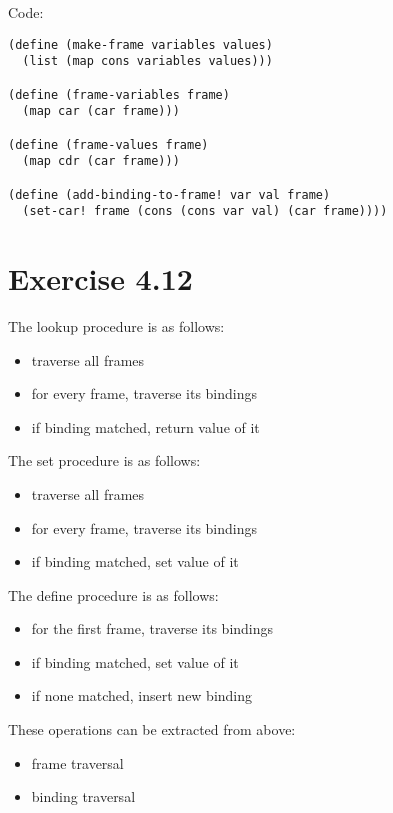 \documentclass[../main.tex]{subfiles}
\begin{document}
Code:

\begin{lstlisting}
(define (make-frame variables values)
  (list (map cons variables values)))

(define (frame-variables frame)
  (map car (car frame)))

(define (frame-values frame)
  (map cdr (car frame)))

(define (add-binding-to-frame! var val frame)
  (set-car! frame (cons (cons var val) (car frame))))
\end{lstlisting}

\section{Exercise 4.12}

The lookup procedure is as follows:

\begin{itemize}
\item traverse all frames
\item for every frame, traverse its bindings
\item if binding matched, return value of it
\end{itemize}

The set procedure is as follows:

\begin{itemize}
\item traverse all frames
\item for every frame, traverse its bindings
\item if binding matched, set value of it
\end{itemize}

The define procedure is as follows:

\begin{itemize}
\item for the first frame, traverse its bindings
\item if binding matched, set value of it
\item if none matched, insert new binding
\end{itemize}

These operations can be extracted from above:

\begin{itemize}
\item frame traversal
\item binding traversal
\end{itemize}
\end{document}
